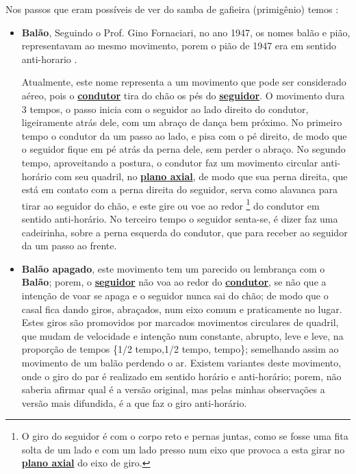 Nos passos que eram possíveis de ver do samba de gafieira (primigênio) temos \cite[pp. 142]{perna2002samba}:
\begin{itemize}
\item \textbf{Balão}, 
Seguindo o Prof. Gino Fornaciari, no ano 1947, os nomes balão e pião,
representavam ao mesmo movimento, porem o pião de 1947 era em sentido anti-horario \cite[pp. 68-72]{fornaciari1947aprender}.

Atualmente, este nome representa a um movimento que pode ser considerado aéreo, 
pois o \hyperref[def:Condutor]{\textbf{condutor}} tira do chão os pés do \hyperref[def:Seguidor]{\textbf{seguidor}}.
O movimento dura 3 tempos, o passo inicia com o seguidor ao lado direito do condutor, 
ligeiramente atrás dele, com um abraço de dança bem próximo.
No primeiro tempo o condutor da um passo ao lado, e pisa com o pé direito,
de modo que o seguidor fique em pé atrás da perna dele, sem perder o abraço.
No segundo tempo, aproveitando a postura, 
o condutor faz um movimento circular anti-horário com seu quadril, no \hyperref[def:PlanoAxial]{\textbf{plano axial}},
de modo que sua perna direita, que está em contato com a perna direita do seguidor,
serva como alavanca para tirar ao seguidor do chão, 
e este gire ou voe ao redor \footnote{O giro do seguidor é com o corpo reto e pernas juntas, 
como se fosse uma fita solta de um lado e com um lado presso num eixo que provoca a esta girar no \hyperref[def:PlanoAxial]{\textbf{plano axial}} do eixo de giro.} 
do condutor em sentido anti-horário.
No terceiro tempo o seguidor senta-se, é dizer faz uma cadeirinha, sobre a perna esquerda do condutor,
que para receber ao seguidor da um passo ao frente. 

\item \textbf{Balão apagado},
 este movimento tem um parecido ou lembrança com o \textbf{Balão}; 
porem, o \hyperref[def:Seguidor]{\textbf{seguidor}} não voa ao redor do \hyperref[def:Condutor]{\textbf{condutor}}, 
se não que a intenção de voar se apaga e o seguidor nunca sai do chão; 
de modo que o casal fica dando giros, abraçados, num eixo comum e praticamente no lugar. 
Estes giros são promovidos por marcados movimentos circulares de quadril, que mudam
de velocidade e intenção num constante, abrupto, leve e leve,  na proporção de tempos \{1/2 tempo,1/2 tempo, tempo\}; 
semelhando assim ao movimento de um balão perdendo o ar.
Existem variantes deste movimento, onde o giro do par é realizado em sentido horário e anti-horário; porem, 
não saberia afirmar qual é a versão original, mas pelas minhas observações a versão mais difundida,
é a que faz o giro  anti-horário.


\end{itemize}
